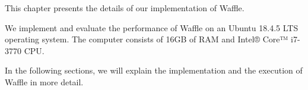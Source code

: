 
This chapter presents the details of our implementation of Waffle.

We implement and evaluate the performance of Waffle on an Ubuntu 18.4.5 LTS operating system. The computer consists of 16GB of RAM and Intel® Core™ i7-3770 CPU. 

In the following sections, we will explain the implementation and the execution of Waffle in more detail.